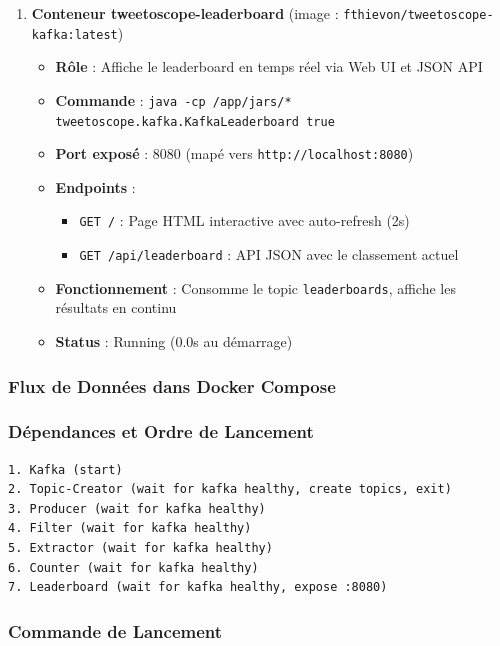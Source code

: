 \documentclass[10pt,a4paper]{article}
\begin{document}
\begin{enumerate}
    \item \textbf{Conteneur tweetoscope-leaderboard} (image : \texttt{fthievon/tweetoscope-kafka:latest})
    \begin{itemize}
        \item \textbf{Rôle} : Affiche le leaderboard en temps réel via Web UI et JSON API
        \item \textbf{Commande} : \texttt{java -cp /app/jars/* tweetoscope.kafka.KafkaLeaderboard true}
        \item \textbf{Port exposé} : 8080 (mapé vers \texttt{http://localhost:8080})
        \item \textbf{Endpoints} :
        \begin{itemize}
            \item \texttt{GET /} : Page HTML interactive avec auto-refresh (2s)
            \item \texttt{GET /api/leaderboard} : API JSON avec le classement actuel
        \end{itemize}
        \item \textbf{Fonctionnement} : Consomme le topic \texttt{leaderboards}, affiche les résultats en continu
        \item \textbf{Status} : Running (0.0s au démarrage)
    \end{itemize}
\end{enumerate}

\subsubsection{Flux de Données dans Docker Compose}

\subsubsection{Dépendances et Ordre de Lancement}

\begin{verbatim}
1. Kafka (start)
2. Topic-Creator (wait for kafka healthy, create topics, exit)
3. Producer (wait for kafka healthy)
4. Filter (wait for kafka healthy)
5. Extractor (wait for kafka healthy)
6. Counter (wait for kafka healthy)
7. Leaderboard (wait for kafka healthy, expose :8080)
\end{verbatim}

\subsubsection{Commande de Lancement}
\end{document}

